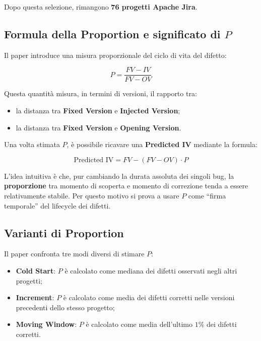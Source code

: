 Dopo questa selezione, rimangono \textbf{76 progetti Apache Jira}.

\subsection{Formula della Proportion e significato di \(P\)}

Il paper introduce una misura proporzionale del ciclo di vita del difetto:

\[
P = \frac{FV - IV}{FV - OV}
\]

Questa quantità misura, in termini di versioni, il rapporto tra:

\begin{itemize}
    \item la distanza tra \textbf{Fixed Version} e \textbf{Injected Version};
    \item la distanza tra \textbf{Fixed Version} e \textbf{Opening Version}.
\end{itemize}

Una volta stimata \(P\), è possibile ricavare una \textbf{Predicted IV} mediante la formula:

\[
\text{Predicted IV} = FV - (FV - OV)\cdot P
\]

\begin{notaprof}
L'idea intuitiva è che, pur cambiando la durata assoluta dei singoli bug, la \textbf{proporzione} tra momento di scoperta e momento di correzione tenda a essere relativamente stabile. Per questo motivo si prova a usare \(P\) come ``firma temporale'' del lifecycle dei difetti.
\end{notaprof}

\subsection{Varianti di Proportion}

Il paper confronta tre modi diversi di stimare \(P\):

\begin{itemize}
    \item \textbf{Cold Start}: \(P\) è calcolato come mediana dei difetti osservati negli altri progetti;
    \item \textbf{Increment}: \(P\) è calcolato come media dei difetti corretti nelle versioni precedenti dello stesso progetto;
    \item \textbf{Moving Window}: \(P\) è calcolato come media dell'ultimo \(1\%\) dei difetti corretti.
\end{itemize}

